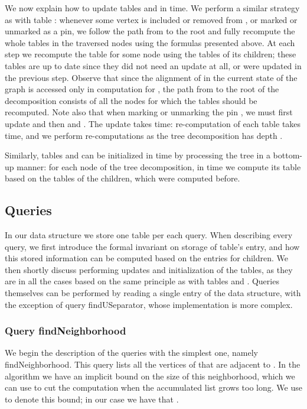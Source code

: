 \documentclass[a4paper,11pt]{article}
\theoremstyle{definition}
\theoremstyle{remark}
\newcommand{\qnei}{\textnormal{findNeighborhood}}
\newcommand{\qUsep}{\textnormal{findUSeparator}}
\begin{document}
\vskip 0.3cm

We now explain how to update tables  and  in  time.  We perform a similar strategy as with
table : whenever some vertex  is included or
removed from , or marked or unmarked as a pin, we follow the path
from  to the root and fully recompute the whole tables 
in the traversed nodes using the formulas presented above.  At each
step we recompute the table for some node using the tables of its
children; these tables are up to date since they did not need an
update at all, or were updated in the previous step.  Observe that
since the alignment of  in the current state of the graph is
accessed only in computation for , the path from  to the
root of the decomposition consists of all the nodes for which the
tables should be recomputed.  Note also that when marking or unmarking
the pin , we must first update  and then  and .
The update takes  time:
re-computation of each table takes  time, and we
perform  re-computations as the tree decomposition has
depth .

Similarly, tables  and  can be initialized in  time by processing the tree in a bottom-up manner:
for each node of the tree decomposition, in 
time we compute its table based on the tables of the children, which
were computed before.

\subsection{Queries}

In our data structure we store one table per each query.  When
describing every query, we first introduce the formal invariant on
storage of table's entry, and how this stored information can be
computed based on the entries for children.  We then shortly discuss
performing updates and initialization of the tables, as they are in
all the cases based on the same principle as with tables  and
.  Queries themselves can be performed by reading a single
entry of the data structure, with the exception of query \qUsep, whose
implementation is more complex.



\subsubsection{Query \qnei}

\newcommand{\tldr}{\XBox}

We begin the description of the queries with the simplest one, namely
\qnei{}.  This query lists all the vertices of  that are adjacent
to .  In the algorithm we have an implicit bound on the size of
this neighborhood, which we can use to cut the computation when the
accumulated list grows too long.  We use  to denote this bound;
in our case we have that .
\end{document}

